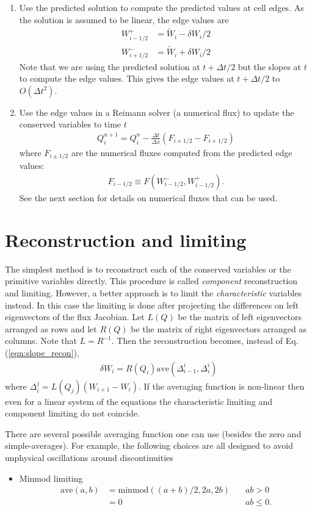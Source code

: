 \documentclass[11pt, reqno]{amsart}
\newcommand{\eqr}[1]{Eq.\thinspace(#1)}
\theoremstyle{definition}
\begin{document}
\begin{enumerate}
\item Use the predicted solution to compute the predicted values at
  cell edges. As the solution is assumed to be linear, the edge values
  are
  \begin{align}
    W_{i-1/2}^+ &= \tilde{W}_i - \delta W_i/2 \\
    W_{i+1/2}^- &= \tilde{W}_i + \delta W_i/2
  \end{align}
  Note that we are using the predicted solution at $t+\Delta t/2$ but
  the slopes at $t$ to compute the edge values. This gives the edge
  values at $t+\Delta t/2$ to $O(\Delta t^2)$.

\item Use the edge values in a Reimann solver (a numerical flux) to
  update the conserved variables to time $t$
  \begin{align}
    Q^{n+1}_i = Q_i^n - \frac{\Delta t}{\Delta x}(F_{i+1/2}-F_{i+1/2})
  \end{align}
  where $F_{i\pm 1/2}$ are the numerical fluxes computed from the
  predicted edge values:
  \begin{align}
    F_{i-1/2} \equiv F(W_{i-1/2}^-, W_{i-1/2}^+).
  \end{align}
  See the next section for details on numerical fluxes that can be used.

\end{enumerate}

\section{Reconstruction and limiting}

The simplest method is to reconstruct each of the conserved variables
or the primitive variables directly. This procedure is called
\emph{component} reconstruction and limiting. However, a better
approach is to limit the \emph{characteristic} variables instead. In
this case the limiting is done after projecting the differences on
left eigenvectors of the flux Jacobian. Let $L(Q)$ be the matrix of
left eigenvectors arranged as rows and let $R(Q)$ be the matrix of
right eigenvectors arranged as columns. Note that $L=R^{-1}$. Then the
reconstruction becomes, instead of \eqr{\ref{eqn:slope_recon}},
\begin{align}
  \delta W_i = R(Q_i) \mathrm{ave}(\Delta^i_{i-1}, \Delta^i_i)
\end{align}
where $\Delta^j_i = L(Q_j)(W_{i+1}-W_i)$. If the averaging function is
non-linear then even for a linear system of the equations the
characteristic limiting and component limiting do not coincide.

There are several possible averaging function one can use (besides the
zero and simple-averages). For example, the following choices are all
designed to avoid unphysical oscillations around discontinuities
\begin{itemize}
  \item Minmod limiting
    \begin{align}
      \mathrm{ave}(a,b) &= \mathrm{minmod}((a+b)/2, 2a, 2b) \quad &ab>0 \\
      &= 0 &ab \le 0.
    \end{align}
\end{itemize}
\end{document}
